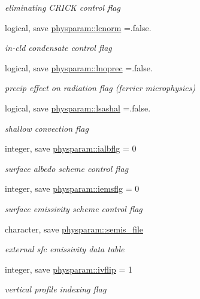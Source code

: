 \begin{DoxyCompactItemize}
\begin{DoxyCompactList}\small\item\em eliminating C\+R\+I\+CK control flag \end{DoxyCompactList}\item 
logical, save \hyperlink{namespacephysparam_ae5b7bb287e8a1f935cf135ffeaadca7a}{physparam\+::lcnorm} =.false.
\begin{DoxyCompactList}\small\item\em in-\/cld condensate control flag \end{DoxyCompactList}\item 
logical, save \hyperlink{namespacephysparam_acb52e2553c9e106bd8885fd09c6e2dd2}{physparam\+::lnoprec} =.false.
\begin{DoxyCompactList}\small\item\em precip effect on radiation flag (ferrier microphysics) \end{DoxyCompactList}\item 
logical, save \hyperlink{namespacephysparam_abd79346fa2177075241fe6c5bc77004d}{physparam\+::lsashal} =.false.
\begin{DoxyCompactList}\small\item\em shallow convection flag \end{DoxyCompactList}\item 
integer, save \hyperlink{namespacephysparam_aeaf899d0cbd4248ad4b7f855cb4626e1}{physparam\+::ialbflg} = 0
\begin{DoxyCompactList}\small\item\em surface albedo scheme control flag \end{DoxyCompactList}\item 
integer, save \hyperlink{namespacephysparam_ac0ecfb79a533c6acab25971a3d871ea2}{physparam\+::iemsflg} = 0
\begin{DoxyCompactList}\small\item\em surface emissivity scheme control flag \end{DoxyCompactList}\item 
character, save \hyperlink{namespacephysparam_a3f616dfa9c7792a45732a16e8e0433c2}{physparam\+::semis\+\_\+file}
\begin{DoxyCompactList}\small\item\em external sfc emissivity data table \end{DoxyCompactList}\item 
integer, save \hyperlink{namespacephysparam_a7318a941744b1ec62dc9a6ff5bfbb50d}{physparam\+::ivflip} = 1
\begin{DoxyCompactList}\small\item\em vertical profile indexing flag \end{DoxyCompactList}\item 

\end{DoxyCompactItemize}
